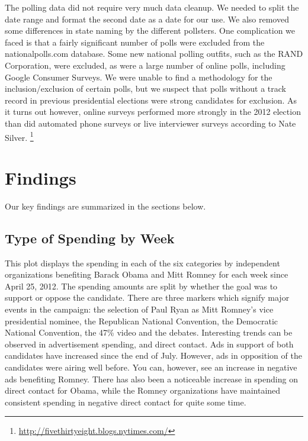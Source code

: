 \documentclass[11pt]{article}\usepackage{graphicx, color}
\begin{document}
The polling data did not require very much data cleanup. We needed to split the date range and format the second date as a date for our use. We also removed some differences in state naming by the different pollsters.  One complication we faced is that a fairly significant number of polls were excluded from the nationalpolls.com database.  Some new national polling outfits, such as the RAND Corporation, were excluded, as were a large number of online polls, including Google Consumer Surveys.  We were unable to find a methodology for the inclusion/exclusion of certain polls, but we suspect that polls without a track record in previous presidential elections were strong candidates for exclusion.  As it turns out however, online surveys performed more strongly in the 2012 election than did automated phone surveys or live interviewer surveys according to Nate Silver. \footnote{\url{http://fivethirtyeight.blogs.nytimes.com/}}


\section{Findings}
Our key findings are summarized in the sections below.

\subsection{Type of Spending by Week}
This plot displays the spending in each of the six categories by independent organizations benefiting Barack Obama and Mitt Romney for each week since April 25, 2012. The spending amounts are split by whether the goal was to support or oppose the candidate. There are three markers which signify major events in the campaign: the selection of Paul Ryan as Mitt Romney's vice presidential nominee, the Republican National Convention, the Democratic National Convention, the 47\% video and the debates. 
Interesting trends can be observed in advertisement spending, and direct contact. Ads in support of both candidates have increased since the end of July. However, ads in opposition of the candidates were airing well before. You can, however, see an increase in negative ads benefiting Romney. There has also been a noticeable increase in spending on direct contact for Obama, while the Romney organizations have maintained consistent spending in negative direct contact for quite some time.
\end{document}
